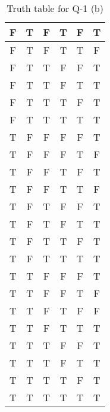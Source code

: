 \documentclass{article}
\begin{document}
\begin{enumerate}
\begin{table} [H]
\begin{tabular}{ | c | c | c | c | c | c | }
                \hline
                F & T & F & T & F & T \\
                \hline
                F & T & F & T & T & F \\
                \hline
                F & T & T & F & F & T \\
                \hline
                F & T & T & F & T & T \\
                \hline
                F & T & T & T & F & T \\
                \hline
                F & T & T & T & T & T \\
                \hline
                T & F & F & F & F & T \\
                \hline
                T & F & F & F & T & F \\
                \hline
                T & F & F & T & F & T \\
                \hline
                T & F & F & T & T & F \\
                \hline
                T & F & T & F & F & T \\
                \hline
                T & F & T & F & T & T \\
                \hline
                T & F & T & T & F & T \\
                \hline
                T & F & T & T & T & T \\
                \hline
                T & T & F & F & F & T \\
                \hline
                T & T & F & F & T & F \\
                \hline
                T & T & F & T & F & F \\
                \hline
                T & T & F & T & T & T \\
                \hline
                T & T & T & F & F & T \\
                \hline
                T & T & T & F & T & T \\
                \hline
                T & T & T & T & F & T \\
                \hline
                T & T & T & T & T & T \\ [1ex] 
                \hline
                \end{tabular}
                \caption{Truth table for Q-1 (b)}
                \label {table:2}
        \end{table}
        \begin{table} [H]
                \centering

\end{table}
\end{enumerate}
\end{document}
